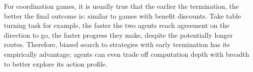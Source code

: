 \documentclass[letterpaper, 10 pt, conference]{ieeeconf}  %
\newcommand{\argmax}{\arg\!\!\max}
\begin{document}
For coordination games, it is usually true that the earlier the termination, 
the better the final outcome is: similar to games with benefit discounts. Take table turning task for example, the faster the two agents 
reach agreement on the direction to go, the faster progress they make, despite 
the potentially longer routes. Therefore, biased search to 
strategies with early termination has its empirically advantage; agents 
can even trade off computation depth with breadth to better explore its action profile. 




\end{document}
